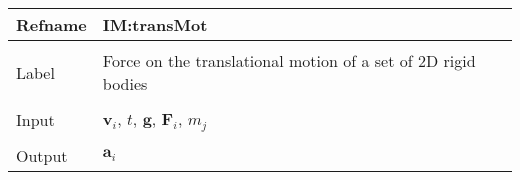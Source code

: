\documentclass[12pt]{article}
\begin{document}
\vspace{\baselineskip}
\noindent
\begin{minipage}{\textwidth}
\begin{tabular}{>{\raggedright}p{}>{\raggedright\arraybackslash}p{}}
\toprule \textbf{Refname} & \textbf{IM:transMot}
\label{IM:transMot}
\\ \midrule \\
Label & Force on the translational motion of a set of 2D rigid bodies
        
\\ \midrule \\
Input & ${\mathbf{v}_{i}}$, $t$, $\mathbf{g}$, ${\mathbf{F}_{i}}$, ${m_{j}}$
        
\\ \midrule \\
Output & ${\mathbf{a}_{i}}$
         

\end{tabular}
\end{minipage}
\end{document}
